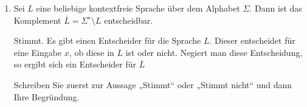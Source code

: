 \documentclass{lehramt-informatik-aufgabe}
\begin{document}
\begin{enumerate}

\item Sei $L$ eine beliebige kontextfreie Sprache über dem Alphabet
$\Sigma$. Dann ist das Komplement $\overline{L} = \Sigma^∗ \setminus L$
entscheidbar.

\begin{liAntwort}
Stimmt. Es gibt einen Entscheider für die Sprache $L$. Dieser
entscheidet für eine Eingabe $x$, ob diese in $L$ ist oder nicht.
Negiert man diese Entscheidung, so ergibt sich ein Entscheider für
$\overline{L}$
\end{liAntwort}

Schreiben Sie zuerst zur Aussage „Stimmt“ oder „Stimmt nicht“ und dann
Ihre Begründung.

\end{enumerate}
\end{document}
